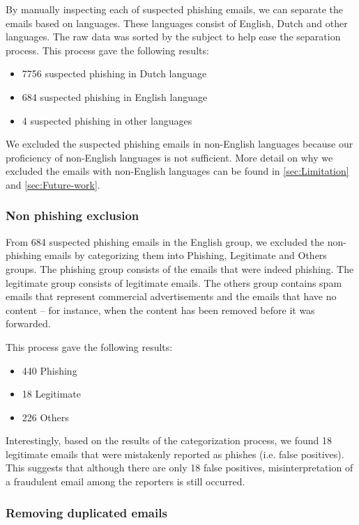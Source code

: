 By manually inspecting each of suspected phishing emails, we can separate
the emails based on languages. These languages consist of English,
Dutch and other languages. The raw data was sorted by the subject
to help ease the separation process. This process gave the following
results:
\begin{itemize}
\item 7756 suspected phishing in Dutch language
\item 684 suspected phishing in English language
\item 4 suspected phishing in other languages
\end{itemize}
We excluded the suspected phishing emails in non-English languages
because our proficiency of non-English languages is not sufficient.
More detail on why we excluded the emails with non-English languages
can be found in \autoref{sec:Limitation} and \autoref{sec:Future-work}. 


\subsubsection{Non phishing exclusion}

From 684 suspected phishing emails in the English group, we excluded
the non-phishing emails by categorizing them into Phishing, Legitimate
and Others groups. The phishing group consists of the emails that
were indeed phishing. The legitimate group consists of legitimate
emails. The others group contains spam emails that represent commercial
advertisements and the emails that have no content -- for instance,
when the content has been removed before it was forwarded. 

This process gave the following results:
\begin{itemize}
\item 440 Phishing
\item 18 Legitimate
\item 226 Others 
\end{itemize}
Interestingly, based on the results of the categorization process,
we found 18 legitimate emails that were mistakenly reported as phishes
(i.e. false positives). This suggests that although there are only
18 false positives, misinterpretation of a fraudulent email among
the reporters is still occurred.


\subsubsection{Removing duplicated emails}

